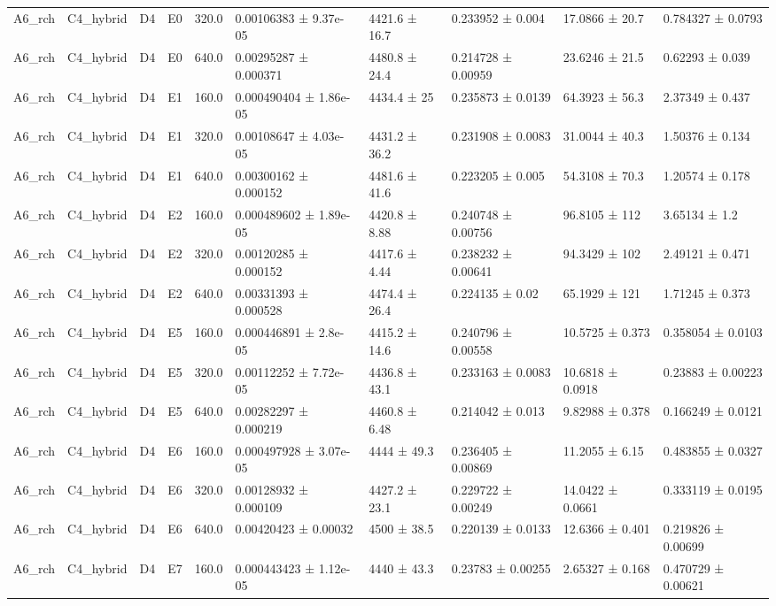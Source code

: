 \begin{table}
\begin{tabular}{llllllllll}
A6\_rch & C4\_hybrid & D4 & E0 & 320.0 & 0.00106383 ± 9.37e-05 & 4421.6 ± 16.7 & 0.233952 ± 0.004 & 17.0866 ± 20.7 & 0.784327 ± 0.0793 \\
A6\_rch & C4\_hybrid & D4 & E0 & 640.0 & 0.00295287 ± 0.000371 & 4480.8 ± 24.4 & 0.214728 ± 0.00959 & 23.6246 ± 21.5 & 0.62293 ± 0.039 \\
A6\_rch & C4\_hybrid & D4 & E1 & 160.0 & 0.000490404 ± 1.86e-05 & 4434.4 ± 25 & 0.235873 ± 0.0139 & 64.3923 ± 56.3 & 2.37349 ± 0.437 \\
A6\_rch & C4\_hybrid & D4 & E1 & 320.0 & 0.00108647 ± 4.03e-05 & 4431.2 ± 36.2 & 0.231908 ± 0.0083 & 31.0044 ± 40.3 & 1.50376 ± 0.134 \\
A6\_rch & C4\_hybrid & D4 & E1 & 640.0 & 0.00300162 ± 0.000152 & 4481.6 ± 41.6 & 0.223205 ± 0.005 & 54.3108 ± 70.3 & 1.20574 ± 0.178 \\
A6\_rch & C4\_hybrid & D4 & E2 & 160.0 & 0.000489602 ± 1.89e-05 & 4420.8 ± 8.88 & 0.240748 ± 0.00756 & 96.8105 ± 112 & 3.65134 ± 1.2 \\
A6\_rch & C4\_hybrid & D4 & E2 & 320.0 & 0.00120285 ± 0.000152 & 4417.6 ± 4.44 & 0.238232 ± 0.00641 & 94.3429 ± 102 & 2.49121 ± 0.471 \\
A6\_rch & C4\_hybrid & D4 & E2 & 640.0 & 0.00331393 ± 0.000528 & 4474.4 ± 26.4 & 0.224135 ± 0.02 & 65.1929 ± 121 & 1.71245 ± 0.373 \\
A6\_rch & C4\_hybrid & D4 & E5 & 160.0 & 0.000446891 ± 2.8e-05 & 4415.2 ± 14.6 & 0.240796 ± 0.00558 & 10.5725 ± 0.373 & 0.358054 ± 0.0103 \\
A6\_rch & C4\_hybrid & D4 & E5 & 320.0 & 0.00112252 ± 7.72e-05 & 4436.8 ± 43.1 & 0.233163 ± 0.0083 & 10.6818 ± 0.0918 & 0.23883 ± 0.00223 \\
A6\_rch & C4\_hybrid & D4 & E5 & 640.0 & 0.00282297 ± 0.000219 & 4460.8 ± 6.48 & 0.214042 ± 0.013 & 9.82988 ± 0.378 & 0.166249 ± 0.0121 \\
A6\_rch & C4\_hybrid & D4 & E6 & 160.0 & 0.000497928 ± 3.07e-05 & 4444 ± 49.3 & 0.236405 ± 0.00869 & 11.2055 ± 6.15 & 0.483855 ± 0.0327 \\
A6\_rch & C4\_hybrid & D4 & E6 & 320.0 & 0.00128932 ± 0.000109 & 4427.2 ± 23.1 & 0.229722 ± 0.00249 & 14.0422 ± 0.0661 & 0.333119 ± 0.0195 \\
A6\_rch & C4\_hybrid & D4 & E6 & 640.0 & 0.00420423 ± 0.00032 & 4500 ± 38.5 & 0.220139 ± 0.0133 & 12.6366 ± 0.401 & 0.219826 ± 0.00699 \\
A6\_rch & C4\_hybrid & D4 & E7 & 160.0 & 0.000443423 ± 1.12e-05 & 4440 ± 43.3 & 0.23783 ± 0.00255 & 2.65327 ± 0.168 & 0.470729 ± 0.00621 \\

\end{tabular}
\end{table}
